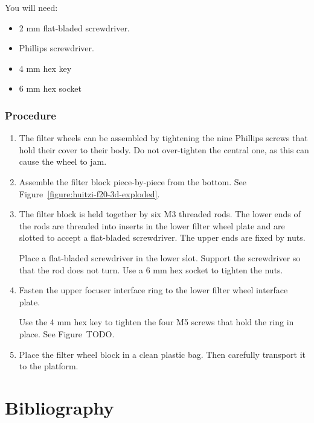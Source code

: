 You will need:

\begin{itemize}
    \item 2 mm flat-bladed screwdriver.
    \item Phillips screwdriver.
    \item 4 mm hex key
    \item 6 mm hex socket
\end{itemize}

\subsubsection{Procedure}

\begin{enumerate}

 \item The filter wheels can be assembled by tightening the nine Phillips screws that hold their cover to their body. Do not over-tighten the central one, as this can cause the wheel to jam.
 
  \item Assemble the filter block piece-by-piece from the bottom. See Figure~\ref{figure:huitzi-f20-3d-exploded}.

  \item The filter block is held together by six M3 threaded rods. The lower ends of the rods are threaded into inserts in the lower filter wheel plate and are slotted to accept a flat-bladed screwdriver. The upper ends are fixed by nuts.
  
  Place a flat-bladed screwdriver in the lower slot. Support the screwdriver so that the rod does not turn. Use a 6 mm hex socket to tighten the nuts.
  
   \item Fasten the upper focuser interface ring to the lower filter wheel interface plate. 
   
   Use the 4 mm hex key to tighten the four M5 screws that hold the ring in place. See Figure~TODO.
   
   \item Place the filter wheel block in a clean plastic bag. Then carefully transport it to the platform.
  
\end{enumerate}


\section{Bibliography}

